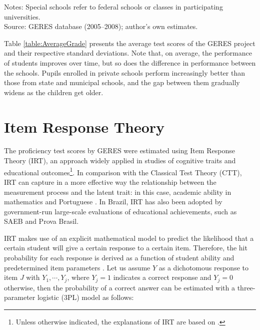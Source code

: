 \documentclass[a4paper, 12pt]{article}
\begin{document}
\vspace{-15pt} \hspace{-20pt}
    \begin{minipage}{1\textwidth} 
{\scriptsize
Notes: Special schools refer to federal schools or classes in participating universities. \\ Source: GERES database (2005–2008); author’s own estimates.\par}
\end{minipage} 
\vspace{5pt}


Table \ref{table:AverageGrade} presents the average test scores of the GERES project and their respective standard deviations. Note that, on average, the performance of students improves over time, but so does the difference in performance between the schools. Pupils enrolled in private schools perform increasingly better than those from state and municipal schools, and the gap between them gradually widens as the children get older.




\section{Item Response Theory} \label{ItemTheory}

The proficiency test scores by GERES were estimated using Item Response Theory (IRT), an approach widely applied in studies of cognitive traits and educational outcomes\footnote{Unless otherwise indicated, the explanations of IRT are based on \citet{brooke2011geres}.}. In comparison with the Classical Test Theory (CTT), IRT can capture in a more effective way the relationship between the measurement process and the latent trait: in this case, academic ability in mathematics and Portuguese \citep{hambleton2013item}. In Brazil, IRT has also been adopted by government-run large-scale evaluations of educational achievements, such as SAEB and Prova Brasil.

IRT makes use of an explicit mathematical model to predict the likelihood that a certain student will give a certain response to a certain item. Therefore, the hit probability for each response is derived as a function of student ability and predetermined item parameters \citep{van2013handbook}. Let us assume $Y$ as a dichotomous response to item $J$ with $Y_{1}, \cdots ,Y_{j}$, where $Y_j=1$ indicates a correct response and $Y_j=0$ otherwise, then the probability of a correct answer can be estimated with a three-parameter logistic (3PL) model as follows: 
\end{document}
